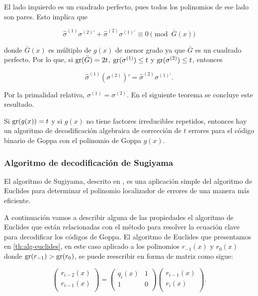 El lado izquierdo es un cuadrado perfecto, pues todos los polinomios de ese lado son pares. Esto implica que

$$\hat{\sigma}^{(1)} \sigma^{(2)'} + \hat{\sigma}^{(2)} \sigma^{(1)'} \equiv 0 \pmod{\bar{G}(x)}$$

donde $\bar{G}(x)$ es múltiplo de $g(x)$ de menor grado ya que $\bar{G}$ es un cuadrado perfecto. Por lo que, si $\operatorname{gr}(\bar{G}) = 2t$, $\operatorname{gr}(\sigma^{(1)}) \leq t$ y $\operatorname{gr}(\sigma^{(2)}) \leq t$, entonces 

$$\hat{\sigma}^{(1)} \left( \sigma^{(2)} \right) ' = \hat{\sigma}^{(2)} \sigma^{(1)'}.$$

Por la primalidad relativa, $\sigma^{(1)} = \sigma^{(2)}$. En el siguiente teorema se concluye este resultado.

\begin{theorem}
    Si $\operatorname{gr}(g(x)) = t$ y si $g(x)$ no tiene factores irreducibles repetidos, entonces hay un algoritmo de decodificación algebraica de corrección de $t$ errores para el código binario de Goppa con el polinomio de Goppa $g(x)$.
\end{theorem}

\subsubsection{Algoritmo de decodificación de Sugiyama}

El algoritmo de Sugiyama, descrito en \cite{Sugiyama_1975}, es una aplicación simple del algoritmo de Euclides para determinar el polinomio localizador de errores de una manera más eficiente.

A continuación vamos a describir alguna de las propiedades el algoritmo de Euclides que están relacionadas con el método para resolver la ecuación clave para decodificar los códigos de Goppa. El algoritmo de Euclides que presentamos en \ref{th:alg-euclides}, en este caso aplicado a los polinomios $r_{-1}(x)$ y $r_0(x)$ donde $\operatorname{gr}(r_{-1}) > \operatorname{gr}(r_0)$, se puede reescribir en forma de matriz como sigue:

\begin{equation}
    \label{alg:euclides-matriz}
    \left( 
        \begin{array}{c}  
            r_{i-2}(x) \\
            r_{i-1}(x) \\
        \end{array} 
    \right)
    = 
    \left( 
        \begin{array}{cc}  
            q_{i}(x) & 1 \\
            1 & 0 \\
        \end{array} 
    \right)
    \left( 
        \begin{array}{c}  
            r_{i-1}(x) \\
            r_{i}(x) \\
        \end{array} 
    \right).
\end{equation}

